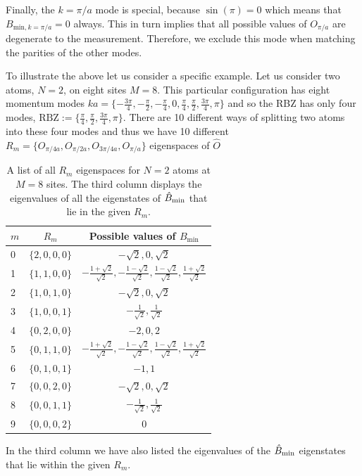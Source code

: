 Finally, the $k = \pi/a$ mode is special, because $\sin(\pi) = 0$
which means that $B_{\mathrm{min},k=\pi/a} = 0$ always. This in turn
implies that all possible values of $O_{\pi/a}$ are degenerate to the
measurement. Therefore, we exclude this mode when matching the
parities of the other modes.

To illustrate the above let us consider a specific example. Let us
consider two atoms, $N=2$, on eight sites $M=8$. This particular
configuration has eight momentum modes
$ka = \{-\frac{3\pi}{4}, -\frac{\pi}{2}, -\frac{\pi}{4}, 0,
\frac{\pi}{4}, \frac{\pi}{2}, \frac{3\pi}{4}, \pi\}$ and so the RBZ
has only four modes,
$\mathrm{RBZ} := \{\frac{\pi}{4}, \frac{\pi}{2}, \frac{3\pi}{4},
\pi\}$. There are 10 different ways of splitting two atoms into these
four modes and thus we have 10 different
$R_m = \{O_{\pi/4a}, O_{\pi/2a} ,O_{3\pi/4a} ,O_{\pi/a}\}$ eigenspaces
of $\hat{O}$
\begin{table}[!htbp]
  \centering
  \begin{tabular}{l c c}
    \toprule
    $m$ & $R_m$ & Possible values of $B_\mathrm{min}$ \\ \midrule
    0 & $\{2,0,0,0\}$ & $ -\sqrt{2}, 0, \sqrt{2}  $ \\
    1 & $\{1,1,0,0\}$ & $  -\frac{1 + \sqrt{2}}{\sqrt{2}}, -\frac{1
                        - \sqrt{2}}{\sqrt{2}}, \frac{1
                        - \sqrt{2}}{\sqrt{2}}, \frac{1 +
                        \sqrt{2}}{\sqrt{2}}  $ \\ 
    2 & $\{1,0,1,0\}$ & $  -\sqrt{2}, 0, \sqrt{2}  $ \\
    3 & $\{1,0,0,1\}$ & $  -\frac{1}{\sqrt{2}},
                        \frac{1}{\sqrt{2}}  $ \\
    4 & $\{0,2,0,0\}$ & $  -2, 0, 2  $ \\
    5 & $\{0,1,1,0\}$ & $  -\frac{1 + \sqrt{2}}{\sqrt{2}}, -\frac{1
                        - \sqrt{2}}{\sqrt{2}}, \frac{1
                        - \sqrt{2}}{\sqrt{2}}, \frac{1 +
                        \sqrt{2}}{\sqrt{2}} $ \\
    6 & $\{0,1,0,1\}$ & $  -1, 1  $ \\
    7 & $\{0,0,2,0\}$ & $  -\sqrt{2}, 0, \sqrt{2}  $ \\
    8 & $\{0,0,1,1\}$ & $  -\frac{1}{\sqrt{2}},
                        \frac{1}{\sqrt{2}}  $ \\
    9 & $\{0,0,0,2\}$ & $0$ \\
    \bottomrule
  \end{tabular}
  \caption[Eigenspace Overlaps]{A list of all $R_m$ eigenspaces for $N
    = 2$ atoms at $M = 8$ sites. The third column displays the eigenvalues of
    all the eigenstates of $\hat{B}_\mathrm{min}$ that lie in the given $R_m$.}
  \label{tab:Rm}
\end{table}
In the third column we have also listed the eigenvalues of the $\hat{B}_\mathrm{min}$
eigenstates that lie within the given $R_m$.

